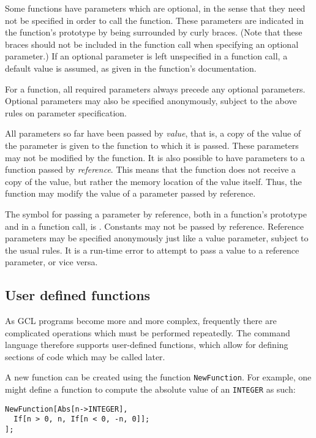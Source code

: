Some functions have parameters which are optional, in the sense that
they need not be specified in order to call the function.  These
parameters are indicated in the function's prototype by being
surrounded by curly braces.  (Note that these braces should not be
included in the function call when specifying an optional parameter.)
If an optional parameter is left unspecified in a function call, a
default value is assumed, as given in the function's documentation.

For a function, all required parameters always precede any optional
parameters.  Optional parameters may also be specified anonymously,
subject to the above rules on parameter specification.

All parameters so far have been passed by {\it value}, that is, a copy
of the value of the parameter is given to the function to which it is
passed.  These parameters may not be modified by the function.  It is
also possible to have parameters to a function passed by {\it
reference}.  This means that the function does not receive a copy of
the value, but rather the memory location of the value itself.  Thus,
the function may modify the value of a parameter passed by reference.

The symbol for passing a parameter by reference, both in a function's
prototype and in a function call, is {\tt <->}.  Constants may not be
passed by reference.  Reference parameters may be specified
anonymously just like a value parameter, subject to the usual rules.
It is a run-time error to attempt to pass a value to a reference
parameter, or vice versa.

\subsection{User defined functions}

As GCL programs become more and more complex, frequently there are
complicated operations which must be performed repeatedly.  The
command language therefore supports user-defined functions, which
allow for defining sections of code which may be called later.

A new function can be created using the function \verb+NewFunction+.
For example, one might define a function to compute the absolute value
of an {\tt INTEGER} as such:

\begin{verbatim}
NewFunction[Abs[n->INTEGER],
  If[n > 0, n, If[n < 0, -n, 0]];
];
\end{verbatim}

